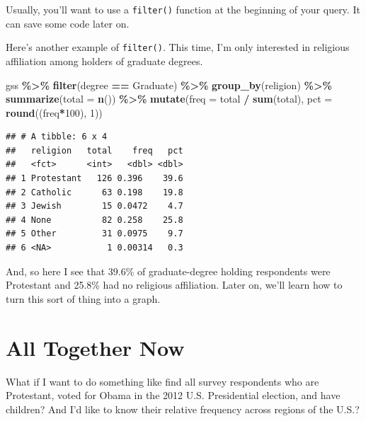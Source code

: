 \documentclass[
]{book}
\newenvironment{Shaded}{\begin{snugshade}}{\end{snugshade}}
\newcommand{\AttributeTok}[1]{\textcolor[rgb]{0.13,0.29,0.53}{#1}}
\newcommand{\DecValTok}[1]{\textcolor[rgb]{0.00,0.00,0.81}{#1}}
\newcommand{\FunctionTok}[1]{\textcolor[rgb]{0.13,0.29,0.53}{\textbf{#1}}}
\newcommand{\NormalTok}[1]{#1}
\newcommand{\SpecialCharTok}[1]{\textcolor[rgb]{0.81,0.36,0.00}{\textbf{#1}}}
\newcommand{\StringTok}[1]{\textcolor[rgb]{0.31,0.60,0.02}{#1}}
\begin{document}
Usually, you'll want to use a \texttt{filter()} function at the beginning of your query. It can save some code later on.

Here's another example of \texttt{filter()}. This time, I'm only interested in religious affiliation among holders of graduate degrees.

\begin{Shaded}
\begin{Highlighting}[]
\NormalTok{gss }\SpecialCharTok{\%\textgreater{}\%}
  \FunctionTok{filter}\NormalTok{(degree }\SpecialCharTok{==} \StringTok{\textquotesingle{}Graduate\textquotesingle{}}\NormalTok{) }\SpecialCharTok{\%\textgreater{}\%}
  \FunctionTok{group\_by}\NormalTok{(religion) }\SpecialCharTok{\%\textgreater{}\%}
  \FunctionTok{summarize}\NormalTok{(}\AttributeTok{total =} \FunctionTok{n}\NormalTok{()) }\SpecialCharTok{\%\textgreater{}\%}
  \FunctionTok{mutate}\NormalTok{(}\AttributeTok{freq =}\NormalTok{ total }\SpecialCharTok{/} \FunctionTok{sum}\NormalTok{(total),}
         \AttributeTok{pct =} \FunctionTok{round}\NormalTok{((freq}\SpecialCharTok{*}\DecValTok{100}\NormalTok{), }\DecValTok{1}\NormalTok{))}
\end{Highlighting}
\end{Shaded}

\begin{verbatim}
## # A tibble: 6 x 4
##   religion   total    freq   pct
##   <fct>      <int>   <dbl> <dbl>
## 1 Protestant   126 0.396    39.6
## 2 Catholic      63 0.198    19.8
## 3 Jewish        15 0.0472    4.7
## 4 None          82 0.258    25.8
## 5 Other         31 0.0975    9.7
## 6 <NA>           1 0.00314   0.3
\end{verbatim}

And, so here I see that 39.6\% of graduate-degree holding respondents were Protestant and 25.8\% had no religious affiliation. Later on, we'll learn how to turn this sort of thing into a graph.

\hypertarget{all-together-now}{%
\section{All Together Now}\label{all-together-now}}

What if I want to do something like find all survey respondents who are Protestant, voted for Obama in the 2012 U.S. Presidential election, and have children? And I'd like to know their relative frequency across regions of the U.S.?
\end{document}
